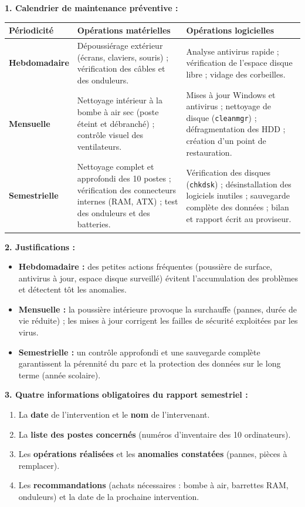 \documentclass[11pt]{article}
\begin{document}
\begin{corrige}
\textbf{1. Calendrier de maintenance préventive :}

\begin{center}
\begin{tabularx}{\linewidth}{|l|X|X|}
\hline
\rowcolor{popblueL}
\textbf{Périodicité} & \textbf{Opérations matérielles} & \textbf{Opérations logicielles} \\
\hline
\textbf{Hebdomadaire} & Dépoussiérage extérieur (écrans, claviers, souris) ; vérification des câbles et des onduleurs. & Analyse antivirus rapide ; vérification de l'espace disque libre ; vidage des corbeilles. \\
\hline
\textbf{Mensuelle} & Nettoyage intérieur à la bombe à air sec (poste éteint et débranché) ; contrôle visuel des ventilateurs. & Mises à jour Windows et antivirus ; nettoyage de disque (\texttt{cleanmgr}) ; défragmentation des HDD ; création d'un point de restauration. \\
\hline
\textbf{Semestrielle} & Nettoyage complet et approfondi des 10 postes ; vérification des connecteurs internes (RAM, ATX) ; test des onduleurs et des batteries. & Vérification des disques (\texttt{chkdsk}) ; désinstallation des logiciels inutiles ; sauvegarde complète des données ; bilan et rapport écrit au proviseur. \\
\hline
\end{tabularx}
\end{center}

\textbf{2. Justifications :}
\begin{itemize}
    \item \textbf{Hebdomadaire :} des petites actions fréquentes (poussière de surface, antivirus à jour, espace disque surveillé) évitent l'accumulation des problèmes et détectent tôt les anomalies.
    \item \textbf{Mensuelle :} la poussière intérieure provoque la surchauffe (pannes, durée de vie réduite) ; les mises à jour corrigent les failles de sécurité exploitées par les virus.
    \item \textbf{Semestrielle :} un contrôle approfondi et une sauvegarde complète garantissent la pérennité du parc et la protection des données sur le long terme (année scolaire).
\end{itemize}

\textbf{3. Quatre informations obligatoires du rapport semestriel :}
\begin{enumerate}
    \item La \textbf{date} de l'intervention et le \textbf{nom} de l'intervenant.
    \item La \textbf{liste des postes concernés} (numéros d'inventaire des 10 ordinateurs).
    \item Les \textbf{opérations réalisées} et les \textbf{anomalies constatées} (pannes, pièces à remplacer).
    \item Les \textbf{recommandations} (achats nécessaires : bombe à air, barrettes RAM, onduleurs) et la date de la prochaine intervention.
\end{enumerate}


\end{corrige}
\end{document}
